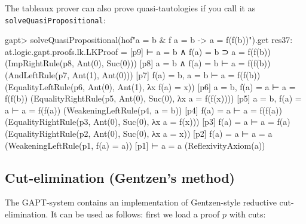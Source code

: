 \documentclass[a4paper,11pt]{article}
\begin{document}
The tableaux prover can also prove quasi-tautologies if you call it as \texttt{solveQuasiPropositional}:
\begin{clilisting}
gapt> solveQuasiPropositional(hof"a = b & f a = b -> a = f(f(b))").get
res37: at.logic.gapt.proofs.lk.LKProof =
[p9]  ⊢ a = b ∧ f(a) = b ⊃ a = f(f(b))    (ImpRightRule(p8, Ant(0), Suc(0)))
[p8] a = b ∧ f(a) = b ⊢ a = f(f(b))    (AndLeftRule(p7, Ant(1), Ant(0)))
[p7] f(a) = b, a = b ⊢ a = f(f(b))    (EqualityLeftRule(p6, Ant(0), Ant(1), λx f(a) = x))
[p6] a = b, f(a) = a ⊢ a = f(f(b))    (EqualityRightRule(p5, Ant(0), Suc(0), λx a = f(f(x))))
[p5] a = b, f(a) = a ⊢ a = f(f(a))    (WeakeningLeftRule(p4, a = b))
[p4] f(a) = a ⊢ a = f(f(a))    (EqualityRightRule(p3, Ant(0), Suc(0), λx a = f(x)))
[p3] f(a) = a ⊢ a = f(a)    (EqualityRightRule(p2, Ant(0), Suc(0), λx a = x))
[p2] f(a) = a ⊢ a = a    (WeakeningLeftRule(p1, f(a) = a))
[p1]  ⊢ a = a    (ReflexivityAxiom(a))

\end{clilisting}

\subsection{Cut-elimination (Gentzen's method)}

The GAPT-system contains an implementation of Gentzen-style reductive
cut-elimination.  It can be used as follows: first we load a proof $p$ with
cuts:
\end{document}
